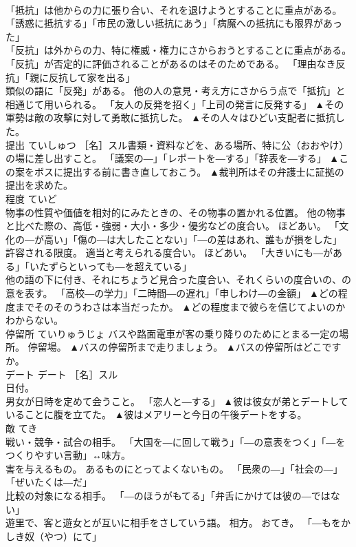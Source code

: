 \documentclass[8pt]{extreport}
\begin{document}
\begin{CJK}{UTF8}{min}
\\	「抵抗」は他からの力に張り合い、それを退けようとすることに重点がある。 「誘惑に抵抗する」「市民の激しい抵抗にあう」「病魔への抵抗にも限界があった」
\\	「反抗」は外からの力、特に権威・権力にさからおうとすることに重点がある。 「反抗」が否定的に評価されることがあるのはそのためである。 「理由なき反抗」「親に反抗して家を出る」
\\	類似の語に「反発」がある。 他の人の意見・考え方にさからう点で「抵抗」と相通じて用いられる。 「友人の反発を招く」「上司の発言に反発する」	▲その軍勢は敵の攻撃に対して勇敢に抵抗した。 ▲その人々はひどい支配者に抵抗した。
\\	提出	ていしゅつ	［名］スル書類・資料などを、ある場所、特に公（おおやけ）の場に差し出すこと。 「議案の―」「レポートを―する」「辞表を―する」	▲この案をボスに提出する前に書き直しておこう。 ▲裁判所はその弁護士に証拠の提出を求めた。
\\	程度	ていど	
\\	物事の性質や価値を相対的にみたときの、その物事の置かれる位置。 他の物事と比べた際の、高低・強弱・大小・多少・優劣などの度合い。 ほどあい。 「文化の―が高い」「傷の―は大したことない」「―の差はあれ、誰もが損をした」 
\\	許容される限度。 適当と考えられる度合い。 ほどあい。 「大きいにも―がある」「いたずらといっても―を超えている」 
\\	他の語の下に付き、それにちょうど見合った度合い、それくらいの度合いの、の意を表す。 「高校―の学力」「二時間―の遅れ」「申しわけ―の金額」	▲どの程度までそのそのうわさは本当だったか。 ▲どの程度まで彼らを信じてよいのかわからない。
\\	停留所	ていりゅうじょ	バスや路面電車が客の乗り降りのためにとまる一定の場所。 停留場。	▲バスの停留所まで走りましょう。 ▲バスの停留所はどこですか。
\\	デート	デート	［名］スル 
\\	日付。 
\\	男女が日時を定めて会うこと。 「恋人と―する」	▲彼は彼女が弟とデートしていることに腹を立てた。 ▲彼はメアリーと今日の午後デートをする。
\\	敵	てき	
\\	戦い・競争・試合の相手。 「大国を―に回して戦う」「―の意表をつく」「―をつくりやすい言動」↔味方。 
\\	害を与えるもの。 あるものにとってよくないもの。 「民衆の―」「社会の―」「ぜいたくは―だ」 
\\	比較の対象になる相手。 「―のほうがもてる」「弁舌にかけては彼の―ではない」 
\\	遊里で、客と遊女とが互いに相手をさしていう語。 相方。 おてき。 「―もをかしき奴（やつ）にて」 

\end{CJK}
\end{document}
